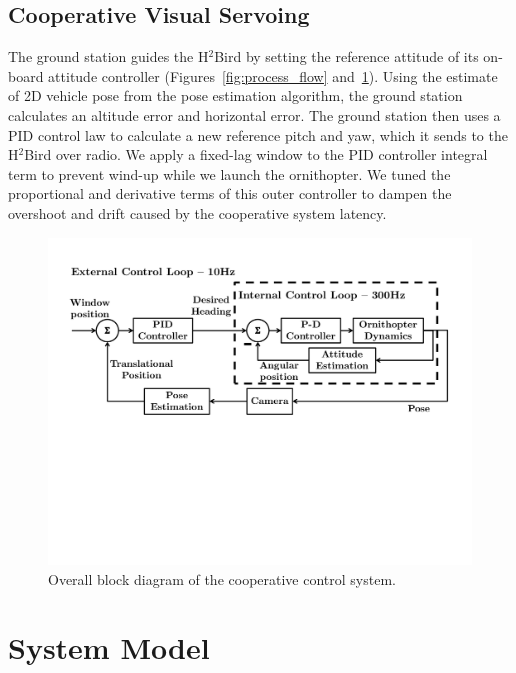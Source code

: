 \documentclass{aamas2013}
\begin{document}
\subsection{Cooperative Visual Servoing}
\label{sec:visual_servoing_concept}
The ground station guides the H$^2$Bird by setting the
reference attitude of its on-board attitude 
controller (Figures~\ref{fig:process_flow} and~\ref{fig:block_diagram}). Using 
the estimate of 2D vehicle pose from the pose estimation algorithm, the 
ground station calculates an altitude error and horizontal error. The ground 
station then uses a PID control law to calculate a new reference pitch and yaw, 
which it sends to the H$^2$Bird over radio. 
We apply a fixed-lag window to the PID 
controller integral term to prevent wind-up while we launch the ornithopter. 
We tuned the proportional and derivative terms of this outer controller to 
dampen the overshoot and drift caused by the cooperative system latency.
\begin{figure}[tb]
\centering
\includegraphics[width=\linewidth]{figures/block_diagrams.pdf}
\caption{Overall block diagram of the cooperative control system.}
\label{fig:block_diagram}
\end{figure}

\section{System Model}
\label{sec:system_model}
\end{document}
